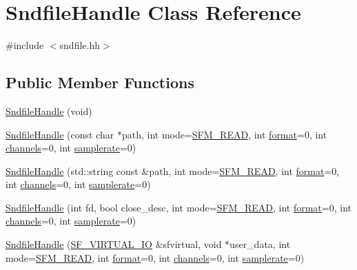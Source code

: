 \hypertarget{class_sndfile_handle}{}\section{Sndfile\+Handle Class Reference}
\label{class_sndfile_handle}


{\ttfamily \#include $<$sndfile.\+hh$>$}

\subsection*{Public Member Functions}
\begin{DoxyCompactItemize}
\item 
\mbox{\hyperlink{class_sndfile_handle_a90b0e918f3531329dfb4ab0988187add}{Sndfile\+Handle}} (void)
\item 
\mbox{\hyperlink{class_sndfile_handle_a60e5ec8dac736c5f3a2fdc95e7e9c70e}{Sndfile\+Handle}} (const char $\ast$path, int mode=\mbox{\hyperlink{sndfile_8h_adc29c2ff13d900c2f185ee95427fb06ca125531fe9c895237bccd35736370e815}{S\+F\+M\+\_\+\+R\+E\+AD}}, int \mbox{\hyperlink{class_sndfile_handle_a72b47b9aee449744817a2d6d702ab457}{format}}=0, int \mbox{\hyperlink{class_sndfile_handle_a710add6f87468ca8f9dc444bf35e7ebc}{channels}}=0, int \mbox{\hyperlink{class_sndfile_handle_aa4db003e80513fff2f861cc17d459911}{samplerate}}=0)
\item 
\mbox{\hyperlink{class_sndfile_handle_af782c1d529a09587c127272bd96cb42a}{Sndfile\+Handle}} (std\+::string const \&path, int mode=\mbox{\hyperlink{sndfile_8h_adc29c2ff13d900c2f185ee95427fb06ca125531fe9c895237bccd35736370e815}{S\+F\+M\+\_\+\+R\+E\+AD}}, int \mbox{\hyperlink{class_sndfile_handle_a72b47b9aee449744817a2d6d702ab457}{format}}=0, int \mbox{\hyperlink{class_sndfile_handle_a710add6f87468ca8f9dc444bf35e7ebc}{channels}}=0, int \mbox{\hyperlink{class_sndfile_handle_aa4db003e80513fff2f861cc17d459911}{samplerate}}=0)
\item 
\mbox{\hyperlink{class_sndfile_handle_a3cbcef78befb00c3ad7391754a9c0343}{Sndfile\+Handle}} (int fd, bool close\+\_\+desc, int mode=\mbox{\hyperlink{sndfile_8h_adc29c2ff13d900c2f185ee95427fb06ca125531fe9c895237bccd35736370e815}{S\+F\+M\+\_\+\+R\+E\+AD}}, int \mbox{\hyperlink{class_sndfile_handle_a72b47b9aee449744817a2d6d702ab457}{format}}=0, int \mbox{\hyperlink{class_sndfile_handle_a710add6f87468ca8f9dc444bf35e7ebc}{channels}}=0, int \mbox{\hyperlink{class_sndfile_handle_aa4db003e80513fff2f861cc17d459911}{samplerate}}=0)
\item 
\mbox{\hyperlink{class_sndfile_handle_a4c0aa4c1c1403c8ee28287a40eda0ddc}{Sndfile\+Handle}} (\mbox{\hyperlink{struct_s_f___v_i_r_t_u_a_l___i_o}{S\+F\+\_\+\+V\+I\+R\+T\+U\+A\+L\+\_\+\+IO}} \&sfvirtual, void $\ast$user\+\_\+data, int mode=\mbox{\hyperlink{sndfile_8h_adc29c2ff13d900c2f185ee95427fb06ca125531fe9c895237bccd35736370e815}{S\+F\+M\+\_\+\+R\+E\+AD}}, int \mbox{\hyperlink{class_sndfile_handle_a72b47b9aee449744817a2d6d702ab457}{format}}=0, int \mbox{\hyperlink{class_sndfile_handle_a710add6f87468ca8f9dc444bf35e7ebc}{channels}}=0, int \mbox{\hyperlink{class_sndfile_handle_aa4db003e80513fff2f861cc17d459911}{samplerate}}=0)

\end{DoxyCompactItemize}
